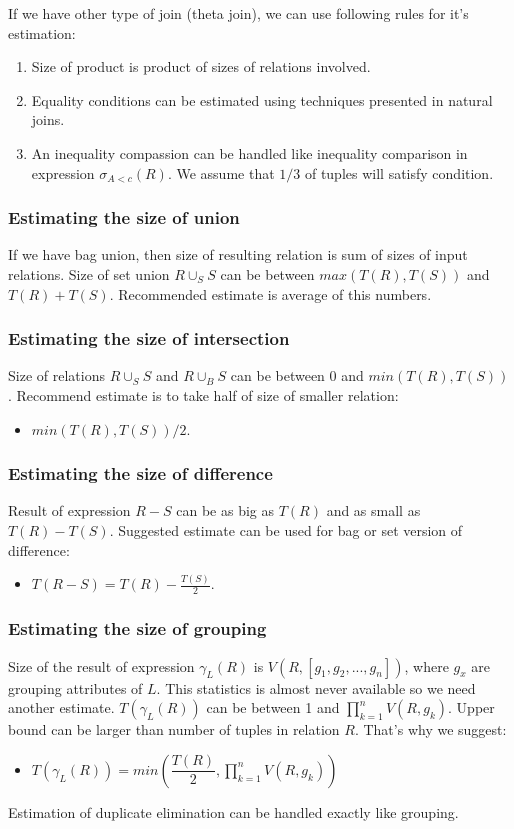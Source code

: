 If we have other type of join (theta join), we can use following rules for it's estimation:
\begin{enumerate}
\item Size of product is product of sizes of relations involved.
\item Equality conditions can be estimated using techniques presented in natural joins.
\item An inequality compassion can be handled like inequality comparison in expression $\sigma_{A<c}(R)$. We assume that $1/3$ of tuples will satisfy condition. 
\end{enumerate}

\subsubsection{Estimating the size of union}

If we have bag union, then size of resulting relation is sum of sizes of input relations. Size of set union $R \cup_S S$ can be between $max(T(R),T(S))$ and $T(R)+T(S)$. Recommended estimate is average of this numbers. 

\subsubsection{Estimating the size of intersection}
Size of relations $R\cup_S S$ and $R\cup_B S$ can be between $0$ and $min(T(R),T(S))$. Recommend estimate is to take half of size of smaller relation:
\begin{itemize}
\item  $min(T(R),T(S))/2$.
\end{itemize}

\subsubsection{Estimating the size of difference}

Result of expression $R-S$ can be as big as $T(R)$ and as small as $T(R)-T(S)$. Suggested estimate can be used for bag or set version of difference: 
\begin{itemize}
\item  $T(R-S)=T(R)-\frac{T(S)}{2}$.
\end{itemize}
\subsubsection{Estimating the size of grouping}
Size of the result of expression $\gamma_L(R)$ is $V(R,[g_1,g_2,...,g_n])$, where $g_x$ are grouping attributes of $L$. This statistics is almost never available so we need another estimate. $T(\gamma_L(R))$ can be between 1 and $\prod_{k=1}^{n}{V(R,g_k)}$. Upper bound can be larger than number of tuples in relation $R$. That's why we suggest:
\begin{itemize}
\item $T(\gamma_L(R))=min(\dfrac{T(R)}{2},\prod_{k=1}^{n}{V(R,g_k)})$
\end{itemize}
Estimation of duplicate elimination can be handled exactly like grouping.

